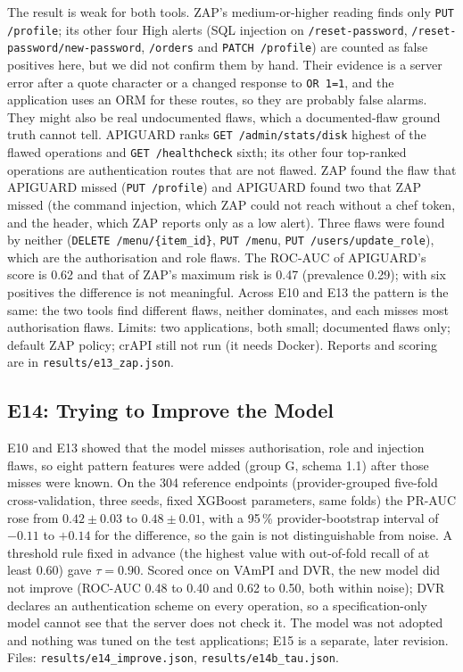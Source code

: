 \documentclass[conference]{IEEEtran}
\begin{document}
The result is weak for both tools. ZAP's medium-or-higher reading finds only \texttt{PUT /profile}; its other four High alerts (SQL injection on \texttt{/reset-password}, \texttt{/reset-password/new-password}, \texttt{/orders} and \texttt{PATCH /profile}) are counted as false positives here, but we did not confirm them by hand.
Their evidence is a server error after a quote character or a changed response to \texttt{OR 1=1}, and the application uses an ORM for these routes, so they are probably false alarms. They might also be real undocumented flaws, which a documented-flaw ground truth cannot tell.
APIGUARD ranks \texttt{GET /admin/stats/disk} highest of the flawed operations and \texttt{GET /healthcheck} sixth; its other four top-ranked operations are authentication routes that are not flawed. ZAP found the flaw that APIGUARD missed (\texttt{PUT /profile}) and APIGUARD found two that ZAP missed
(the command injection, which ZAP could not reach without a chef token, and the header, which ZAP reports only as a low alert). Three flaws were found by neither (\texttt{DELETE /menu/\{item\_id\}}, \texttt{PUT /menu}, \texttt{PUT /users/update\_role}), which are the authorisation and role flaws.
The ROC-AUC of APIGUARD's score is 0.62 and that of ZAP's maximum risk is 0.47 (prevalence 0.29); with six positives the difference is not meaningful. Across E10 and E13 the pattern is the same: the two tools find different flaws, neither dominates, and each misses most authorisation flaws.
Limits: two applications, both small; documented flaws only; default ZAP policy; crAPI still not run (it needs Docker). Reports and scoring are in \texttt{results/e13\_zap.json}.

\subsection{E14: Trying to Improve the Model}
\label{sec:e14}
E10 and E13 showed that the model misses authorisation, role and injection flaws, so eight pattern features were added (group G, schema 1.1) after those misses were known. On the 304 reference endpoints (provider-grouped five-fold cross-validation, three seeds, fixed XGBoost parameters, same folds) the PR-AUC rose from $0.42\pm0.03$ to $0.48\pm0.01$, with a 95\,\% provider-bootstrap interval of $-0.11$ to $+0.14$ for the difference, so the gain is not distinguishable from noise. A threshold rule fixed in advance (the highest value with out-of-fold recall of at least 0.60) gave $\tau=0.90$. Scored once on VAmPI and DVR, the new model did not improve (ROC-AUC 0.48 to 0.40 and 0.62 to 0.50, both within noise); DVR declares an authentication scheme on every operation, so a specification-only model cannot see that the server does not check it. The model was not adopted and nothing was tuned on the test applications; E15 is a separate, later revision. Files: \texttt{results/e14\_improve.json}, \texttt{results/e14b\_tau.json}.
\end{document}
